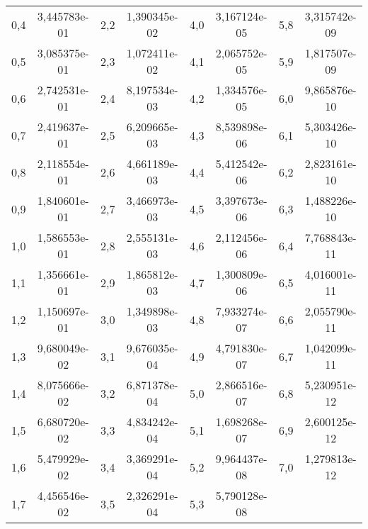 \documentclass[en]{article}
\begin{document}
\begin{center}
\begin{tabular}{cc|cc|cc|cc}
        0,4 & 3,445783e-01 & 2,2 & 1,390345e-02 & 4,0 & 3,167124e-05 & 5,8 & 3,315742e-09 \\
        0,5 & 3,085375e-01 & 2,3 & 1,072411e-02 & 4,1 & 2,065752e-05 & 5,9 & 1,817507e-09 \\
        0,6 & 2,742531e-01 & 2,4 & 8,197534e-03 & 4,2 & 1,334576e-05 & 6,0 & 9,865876e-10 \\
        0,7 & 2,419637e-01 & 2,5 & 6,209665e-03 & 4,3 & 8,539898e-06 & 6,1 & 5,303426e-10 \\
        0,8 & 2,118554e-01 & 2,6 & 4,661189e-03 & 4,4 & 5,412542e-06 & 6,2 & 2,823161e-10 \\
        0,9 & 1,840601e-01 & 2,7 & 3,466973e-03 & 4,5 & 3,397673e-06 & 6,3 & 1,488226e-10 \\
        1,0 & 1,586553e-01 & 2,8 & 2,555131e-03 & 4,6 & 2,112456e-06 & 6,4 & 7,768843e-11 \\
        1,1 & 1,356661e-01 & 2,9 & 1,865812e-03 & 4,7 & 1,300809e-06 & 6,5 & 4,016001e-11 \\
        1,2 & 1,150697e-01 & 3,0 & 1,349898e-03 & 4,8 & 7,933274e-07 & 6,6 & 2,055790e-11 \\
        1,3 & 9,680049e-02 & 3,1 & 9,676035e-04 & 4,9 & 4,791830e-07 & 6,7 & 1,042099e-11 \\
        1,4 & 8,075666e-02 & 3,2 & 6,871378e-04 & 5,0 & 2,866516e-07 & 6,8 & 5,230951e-12 \\
        1,5 & 6,680720e-02 & 3,3 & 4,834242e-04 & 5,1 & 1,698268e-07 & 6,9 & 2,600125e-12 \\
        1,6 & 5,479929e-02 & 3,4 & 3,369291e-04 & 5,2 & 9,964437e-08 & 7,0 & 1,279813e-12 \\
        1,7 & 4,456546e-02 & 3,5 & 2,326291e-04 & 5,3 & 5,790128e-08 & \\                 
    \end{tabular}
    \renewcommand{\arraystretch}{1}
    \vspace{0.5cm}

\end{center}
\end{document}
